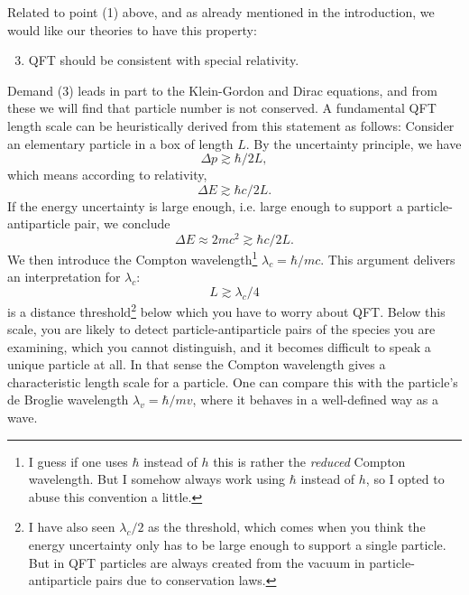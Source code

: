 Related to point (1) above, and as already mentioned in the introduction, we
would like our theories to have this property:
\begin{enumerate}
  \setcounter{enumi}{2}
  \item QFT should be consistent with special relativity.
\end{enumerate}
Demand (3) leads in part to the Klein-Gordon and Dirac equations, and from these
we will find that particle number is not conserved.
A fundamental QFT length scale can be heuristically derived from this statement 
as follows: Consider an elementary particle in a box of length $L$. By the 
uncertainty principle, we have
\begin{equation}
  \Delta p\gtrsim \hbar/2L,
\end{equation}
which means according to relativity,
\begin{equation}
  \Delta E\gtrsim \hbar c/2L.
\end{equation}
If the energy uncertainty is large enough, i.e. large enough to support a
particle-antiparticle pair, we conclude
\begin{equation}
  \Delta E\approx 2mc^2 \gtrsim\hbar c/2L.
\end{equation}
We then introduce the Compton wavelength\footnote{I guess if
one uses $\hbar$ instead of $h$ this is rather the {\it reduced} Compton
wavelength. But I somehow always work using $\hbar$ instead of $h$, so I opted
to abuse this convention a little.}
$\lambda_c=\hbar/mc$. This argument delivers an interpretation for 
$\lambda_c$:
\begin{equation}
  L \gtrsim \lambda_c/4
\end{equation}
is a distance threshold\footnote{I have also seen $\lambda_c/2$ as the threshold,
which comes when you think the energy uncertainty only has to be large enough to
support a single particle. But in QFT particles are always created from the
vacuum in particle-antiparticle pairs due to conservation laws.} below which 
you have to worry about QFT. Below this scale, you are likely to detect
particle-antiparticle pairs of the species you are examining, which you cannot
distinguish, and it becomes difficult to speak a unique particle at all. In that
sense the Compton wavelength gives a characteristic length scale for a
particle. One can compare this with the particle's de Broglie wavelength
$\lambda_v=\hbar/mv$, where it behaves in a well-defined way as a wave.



